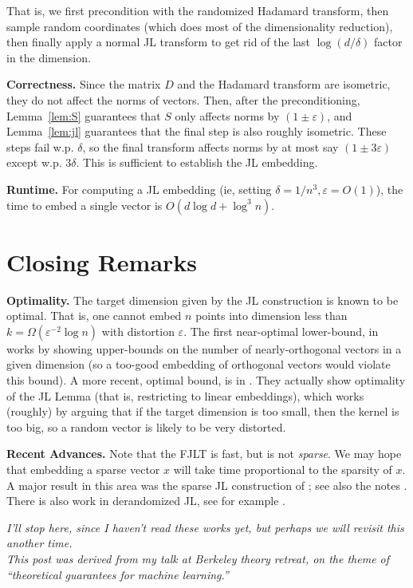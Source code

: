 \documentclass[]{article}
\newcommand{\1}{\mathbb{1}}
\renewcommand{\epsilon}{\varepsilon}
\begin{document}
That is, we first precondition with the randomized Hadamard transform,
then sample random coordinates (which does most of the dimensionality reduction),
then finally apply a normal JL transform to get rid of the last $\log(d/\delta)$
factor in the dimension.

{\bf Correctness.} Since the matrix $D$ and the Hadamard transform are
isometric, they do not affect the norms of vectors.
Then, after the preconditioning,
Lemma~\ref{lem:S} guarantees that $S$ only affects norms by $(1 \pm
\epsilon)$, and Lemma~\ref{lem:jl} guarantees that the
final step is also roughly isometric. These steps fail w.p. $\delta$, so the
final transform affects norms by at most say $(1\pm 3\epsilon)$ except w.p.
$3\delta$.
This is sufficient to establish the JL embedding.

{\bf Runtime.}
For computing a JL embedding (ie, setting $\delta = 1/n^3, \epsilon=O(1)$),
the time to embed a single vector is
$O(d \log d + \log^3 n)$.

\section{Closing Remarks}

{\bf Optimality.}
The target dimension given by the JL construction is known to be optimal.
That is, one cannot embed $n$ points into dimension less than $k=\Omega(\epsilon^{-2}\log n)$
with distortion $\epsilon$.
The first near-optimal lower-bound, in \cite[Section 9]{alon}
works by showing upper-bounds on the number of nearly-orthogonal vectors in a
given dimension (so a too-good embedding of orthogonal vectors would violate this bound).
A more recent, optimal bound, is in \cite[Section 6]{kane}.
They actually show optimality of the JL Lemma (that is, restricting to linear
embeddings), which works (roughly) by arguing that if the target dimension is
too small, then the kernel is too big, so a random vector is likely to be very
distorted.

{\bf Recent Advances.}
Note that the FJLT is fast, but is not \emph{sparse}.
We may hope that embedding a sparse vector $x$ will take time proportional to
the sparsity of $x$. A major result in this area was
the sparse JL construction of \cite{sparseJL}; see also the notes \cite{jlnotes}.
There is also work in derandomized JL, see for example \cite{kane}.

{\it I'll stop here, since I haven't read these works yet, but
perhaps we will revisit this another time.\\
    This post was derived from my talk at Berkeley theory retreat,
    on the theme of ``theoretical guarantees for machine learning.''
}

{}

\end{document}

